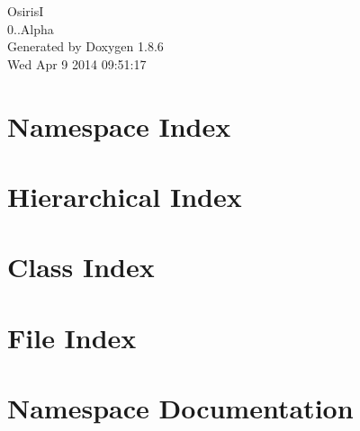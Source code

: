 \documentclass[twoside]{book}
\newcommand{\clearemptydoublepage}{%
  \newpage{\pagestyle{empty}\cleardoublepage}%
}
\begin{document}
\hypersetup{pageanchor=false}
\begin{titlepage}
\vspace*{7cm}
\begin{center}%
{\Large Osiris\-I \\[1ex]\large 0..\-Alpha }\\
\vspace*{1cm}
{\large Generated by Doxygen 1.8.6}\\
\vspace*{0.5cm}
{\small Wed Apr 9 2014 09:51:17}\\
\end{center}
\end{titlepage}
\clearemptydoublepage
\tableofcontents
\clearemptydoublepage
{}
\hypersetup{pageanchor=true}

\chapter{Namespace Index}

\chapter{Hierarchical Index}

\chapter{Class Index}

\chapter{File Index}

\chapter{Namespace Documentation}

















\end{document}
